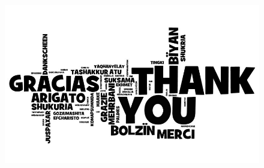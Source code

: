 \documentclass[aspectratio=169]{beamer}
\begin{document}
\begin{frame}
  \begin{figure}
    \includegraphics[height=.7\textheight]{./img/011_-_thanks.jpg}
  \end{figure}
\end{frame}




\end{document}
